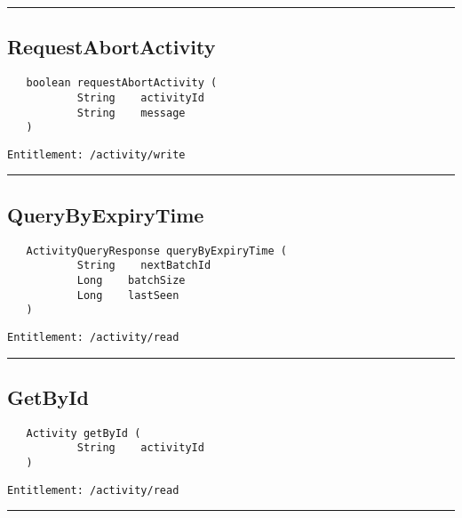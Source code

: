 \rule{12cm}{2pt}
\subsection{RequestAbortActivity}
\label{Api:RequestAbortActivity}
\begin{verbatim}
   boolean requestAbortActivity (
           String    activityId
           String    message
   )
\end{verbatim}
\begin{Verbatim}[fontsize=\small, formatcom=\color{Maroon}]
  Entitlement: /activity/write
\end{Verbatim}



\rule{12cm}{2pt}
\subsection{QueryByExpiryTime}
\label{Api:QueryByExpiryTime}
\begin{verbatim}
   ActivityQueryResponse queryByExpiryTime (
           String    nextBatchId
           Long    batchSize
           Long    lastSeen
   )
\end{verbatim}
\begin{Verbatim}[fontsize=\small, formatcom=\color{Maroon}]
  Entitlement: /activity/read
\end{Verbatim}



\rule{12cm}{2pt}
\subsection{GetById}
\label{Api:GetById}
\begin{verbatim}
   Activity getById (
           String    activityId
   )
\end{verbatim}
\begin{Verbatim}[fontsize=\small, formatcom=\color{Maroon}]
  Entitlement: /activity/read
\end{Verbatim}



\rule{12cm}{2pt}
